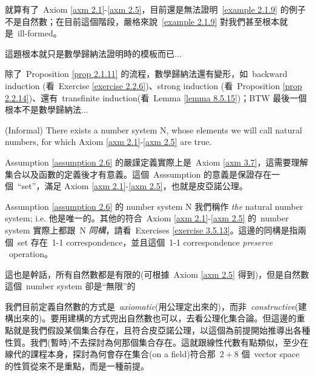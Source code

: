 \begin{note}
就算有了\ Axiom \ref{axm 2.1}-\ref{axm 2.5}，目前還是無法證明\  \ref{example 2.1.9} 的例子不是自然數；在目前這個階段，嚴格來說\ \ref{example 2.1.9} 對我們甚至根本就是\ ill-formed。
\end{note}

\begin{proposition}\label{prop 2.1.11}
這題根本就只是數學歸納法證明時的模板而已...
\end{proposition}

\begin{note}
除了\ Proposition \ref{prop 2.1.11} 的流程，數學歸納法還有變形，如\ backward induction (看\ Exercise \ref{exercise 2.2.6})、strong induction (看\ Proposition \ref{prop 2.2.14})、還有\ transfinite induction(看\ Lemma \ref{lemma 8.5.15})；BTW 最後一個根本不是數學歸納法...
\end{note}

\begin{assumption}\label{assumption 2.6} (Informal)
There exists a number system N, whose elements we will call natural numbers, for which Axiom \ref{axm 2.1}-\ref{axm 2.5} are true.
\end{assumption}
\begin{note}
Assumption \ref{assumption 2.6} 的嚴謹定義實際上是\ Axiom \ref{axm 3.7}，這需要理解集合以及函數的定義後才有意義。這個\ Asssumption 的意義是保證存在一個\ ``set''，滿足 Axiom \ref{axm 2.1}-\ref{axm 2.5}，也就是皮亞諾公理。
\end{note}

\begin{remark}\label{remark 2.1.12} Assumption \ref{assumption 2.6} 的 number system N 我們稱作 \emph{the} natural number system; i.e. 他是唯一的。其他的符合\ Axiom \ref{axm 2.1}-\ref{axm 2.5} 的\ number system 實際上都跟\ N \emph{同構}，請看\ Exercises \ref{exercise 3.5.13}。這邊的同構是指兩個\ set 存在\ 1-1 correspondence，並且這個\ 1-1 correspondence \emph{preserve} \INC\ operation。
\end{remark}

\begin{remark}\label{remark 2.1.13}
這也是幹話，所有自然數都是有限的(可根據\ Axiom \ref{axm 2.5} 得到)，但是自然數這個\ number system 卻是``無限''的
\end{remark}

\begin{remark}\label{remark 2.1.14}
我們目前定義自然數的方式是\ \emph{axiomatic}(用公理定出來的)，而非\ \emph{constructive}(建構出來的)。要用建構的方式兜出自然數也可以，去看公理化集合論。但這邊的重點就是我們假設某個集合存在，且符合皮亞諾公理，以這個為前提開始推導出各種性質。我們(暫時)不去探討為何那個集合存在。這就跟線性代數有點類似，至少在線代的課程本身，探討為何會存在集合(on a field)符合那\ \(2+8\) 個\ vector space 的性質從來不是重點，而是一種前提。
\end{remark}

